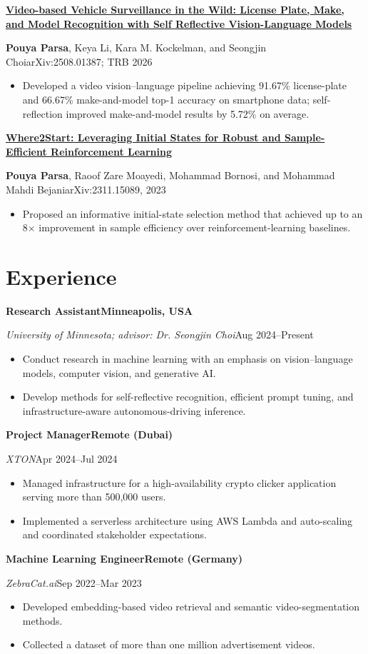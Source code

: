 \documentclass[10pt,letterpaper]{article}
\newcommand{\cvheading}[4]{%
  \needspace{4\baselineskip}%
  \textbf{#1}\hfill\textbf{#2}\par
  \textit{#3}\hfill#4\par
  \vspace{0.15em}%
}
\newcommand{\publication}[5]{%
  \needspace{6\baselineskip}%
  \href{#4}{\textbf{#1}}\par
  #2\hfill#3\par
  \begin{itemize}
    \item #5
  \end{itemize}
  \vspace{0.15em}%
}
\begin{document}
\publication
  {Video-based Vehicle Surveillance in the Wild: License Plate, Make, and Model Recognition with Self Reflective Vision-Language Models}
  {\textbf{Pouya Parsa}, Keya Li, Kara M. Kockelman, and Seongjin Choi}
  {arXiv:2508.01387; TRB 2026}
  {https://arxiv.org/abs/2508.01387}
  {Developed a video vision--language pipeline achieving 91.67\% license-plate and 66.67\% make-and-model top-1 accuracy on smartphone data; self-reflection improved make-and-model results by 5.72\% on average.}

\publication
  {Where2Start: Leveraging Initial States for Robust and Sample-Efficient Reinforcement Learning}
  {\textbf{Pouya Parsa}, Raoof Zare Moayedi, Mohammad Bornosi, and Mohammad Mahdi Bejani}
  {arXiv:2311.15089, 2023}
  {https://arxiv.org/abs/2311.15089}
  {Proposed an informative initial-state selection method that achieved up to an 8$\times$ improvement in sample efficiency over reinforcement-learning baselines.}

\section{Experience}

\cvheading
  {Research Assistant}
  {Minneapolis, USA}
  {University of Minnesota; advisor: Dr. Seongjin Choi}
  {Aug 2024--Present}
\begin{itemize}
  \item Conduct research in machine learning with an emphasis on vision--language models, computer vision, and generative AI.
  \item Develop methods for self-reflective recognition, efficient prompt tuning, and infrastructure-aware autonomous-driving inference.
\end{itemize}

\cvheading
  {Project Manager}
  {Remote (Dubai)}
  {XTON}
  {Apr 2024--Jul 2024}
\begin{itemize}
  \item Managed infrastructure for a high-availability crypto clicker application serving more than 500,000 users.
  \item Implemented a serverless architecture using AWS Lambda and auto-scaling and coordinated stakeholder expectations.
\end{itemize}

\newpage
\cvheading
  {Machine Learning Engineer}
  {Remote (Germany)}
  {ZebraCat.ai}
  {Sep 2022--Mar 2023}
\begin{itemize}
  \item Developed embedding-based video retrieval and semantic video-segmentation methods.
  \item Collected a dataset of more than one million advertisement videos.
\end{itemize}
\end{document}
